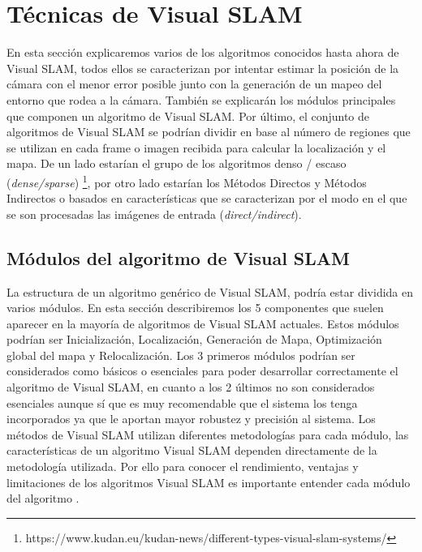 \section{Técnicas de Visual SLAM} \label{s:tecnicas}

En esta sección explicaremos varios de los algoritmos conocidos hasta ahora de Visual SLAM, todos ellos se caracterizan por intentar estimar la posición de la cámara con el menor error posible junto con la generación de un mapeo del entorno que rodea a la cámara.
También se explicarán los módulos principales que componen un algoritmo de Visual SLAM.
Por último, el conjunto de algoritmos de Visual SLAM se podrían dividir en base al número de regiones que se utilizan en cada frame o imagen recibida para calcular la localización y el mapa. De un lado estarían el grupo de los algoritmos denso / escaso (\textit{dense/sparse}) \footnote{https://www.kudan.eu/kudan-news/different-types-visual-slam-systems/}, por otro lado estarían los Métodos Directos y Métodos Indirectos o basados en características que se caracterizan por el modo en el que se son procesadas las imágenes de entrada (\textit {direct/indirect}).

\subsection{Módulos del algoritmo de Visual SLAM}
La estructura de un algoritmo genérico  de Visual SLAM, podría estar dividida en varios módulos. En esta sección describiremos los 5 componentes que suelen aparecer en la mayoría de algoritmos de Visual SLAM actuales. Estos módulos podrían ser Inicialización, Localización, Generación de Mapa, Optimización global del mapa y Relocalización. Los 3 primeros módulos podrían ser considerados como básicos o esenciales para poder desarrollar correctamente el algoritmo de Visual SLAM, en cuanto a los 2 últimos no son considerados esenciales aunque sí que es muy recomendable que el sistema los tenga incorporados ya que le aportan mayor robustez y precisión al sistema. 
Los métodos de Visual SLAM utilizan diferentes metodologías para cada módulo, las características de un algoritmo Visual SLAM dependen directamente de la metodología utilizada. Por ello para conocer el rendimiento, ventajas y limitaciones de los algoritmos Visual SLAM es importante entender cada módulo del algoritmo \cite{Takafumi17}.

